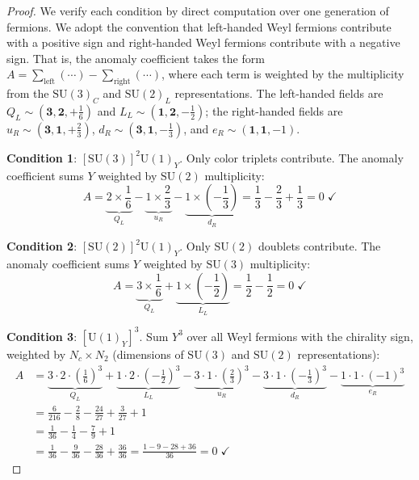 \documentclass[12pt]{article}
\theoremstyle{definition}
\theoremstyle{remark}
\begin{document}
\begin{proof}
We verify each condition by direct computation over one generation of fermions. We adopt the convention that left-handed Weyl fermions contribute with a positive sign and right-handed Weyl fermions contribute with a negative sign. That is, the anomaly coefficient takes the form $A = \sum_{\text{left}} (\cdots) - \sum_{\text{right}} (\cdots)$, where each term is weighted by the multiplicity from the $\mathrm{SU}(3)_C$ and $\mathrm{SU}(2)_L$ representations. The left-handed fields are $Q_L \sim (\mathbf{3}, \mathbf{2}, +\frac{1}{6})$ and $L_L \sim (\mathbf{1}, \mathbf{2}, -\frac{1}{2})$; the right-handed fields are $u_R \sim (\mathbf{3}, \mathbf{1}, +\frac{2}{3})$, $d_R \sim (\mathbf{3}, \mathbf{1}, -\frac{1}{3})$, and $e_R \sim (\mathbf{1}, \mathbf{1}, -1)$.

\textbf{Condition 1}: $[\mathrm{SU}(3)]^2 \mathrm{U}(1)_Y$. Only color triplets contribute. The anomaly coefficient sums $Y$ weighted by $\mathrm{SU}(2)$ multiplicity:
\begin{equation}
A = \underbrace{2 \times \frac{1}{6}}_{Q_L} - \underbrace{1 \times \frac{2}{3}}_{u_R} - \underbrace{1 \times \left(-\frac{1}{3}\right)}_{d_R} = \frac{1}{3} - \frac{2}{3} + \frac{1}{3} = 0 \; \checkmark
\end{equation}

\textbf{Condition 2}: $[\mathrm{SU}(2)]^2 \mathrm{U}(1)_Y$. Only $\mathrm{SU}(2)$ doublets contribute. The anomaly coefficient sums $Y$ weighted by $\mathrm{SU}(3)$ multiplicity:
\begin{equation}
A = \underbrace{3 \times \frac{1}{6}}_{Q_L} + \underbrace{1 \times \left(-\frac{1}{2}\right)}_{L_L} = \frac{1}{2} - \frac{1}{2} = 0 \; \checkmark
\end{equation}

\textbf{Condition 3}: $[\mathrm{U}(1)_Y]^3$. Sum $Y^3$ over all Weyl fermions with the chirality sign, weighted by $N_c \times N_2$ (dimensions of $\mathrm{SU}(3)$ and $\mathrm{SU}(2)$ representations):
\begin{align}
A &= \underbrace{3 \cdot 2 \cdot \left(\frac{1}{6}\right)^3}_{Q_L} + \underbrace{1 \cdot 2 \cdot \left(-\frac{1}{2}\right)^3}_{L_L} - \underbrace{3 \cdot 1 \cdot \left(\frac{2}{3}\right)^3}_{u_R} - \underbrace{3 \cdot 1 \cdot \left(-\frac{1}{3}\right)^3}_{d_R} - \underbrace{1 \cdot 1 \cdot (-1)^3}_{e_R} \nonumber \\
&= \frac{6}{216} - \frac{2}{8} - \frac{24}{27} + \frac{3}{27} + 1 \nonumber \\
&= \frac{1}{36} - \frac{1}{4} - \frac{7}{9} + 1 \nonumber \\
&= \frac{1}{36} - \frac{9}{36} - \frac{28}{36} + \frac{36}{36} = \frac{1 - 9 - 28 + 36}{36} = 0 \; \checkmark
\end{align}


\end{proof}
\end{document}
